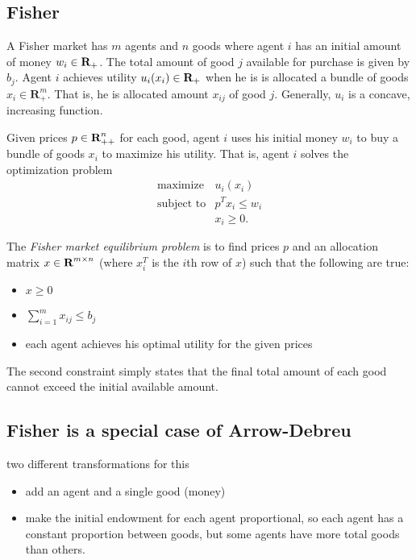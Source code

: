 \documentclass{article}
\begin{document}
\subsection{Fisher}

A Fisher market has $m$ agents and $n$ goods where
agent $i$ has an initial amount of money $w_i \in {\mbox{\bf R}}_+$.
The total amount of good $j$ available for purchase is given by $b_j$.
Agent $i$ achieves utility $u_i(x_i) \in {\mbox{\bf R}}_+$ when he is is allocated a bundle of goods $x_i \in \mathbf{R}^m_{+}$. That is, he is allocated amount $x_{ij}$ of good $j$.
Generally, $u_i$ is a concave, increasing function.

Given prices $p \in {\mbox{\bf R}}^n_{++}$ for each good, agent $i$ uses his initial money $w_i$ to buy a bundle of goods $x_i$ to maximize his utility. That is, agent $i$ solves the optimization problem
\[
\begin{array}{ll}
\mbox{maximize} & u_i(x_i) \\
\mbox{subject to} & p^T x_i \leq w_i \\
& x_i \geq 0.
\end{array}
\]

The \emph{Fisher market equilibrium problem} is to find prices $p$ and an allocation matrix $x \in {\mbox{\bf R}}^{m \times n}$ (where $x_i^T$ is the $i$th row of $x$) such that the following are true:
\begin{itemize}
\item $x \geq 0$
\item $\sum_{i=1}^m x_{ij} \leq b_j$
\item each agent achieves his optimal utility for the given prices
\end{itemize}

The second constraint simply states that the final total amount of each good cannot exceed the initial available amount.



\subsection{Fisher is a special case of Arrow-Debreu}
two different transformations for this
\begin{itemize}
\item add an agent and a single good (money)
\item make the initial endowment for each agent proportional,
so each agent has a constant proportion between goods, but some agents have more total goods than others. 
\end{itemize}
\end{document}
